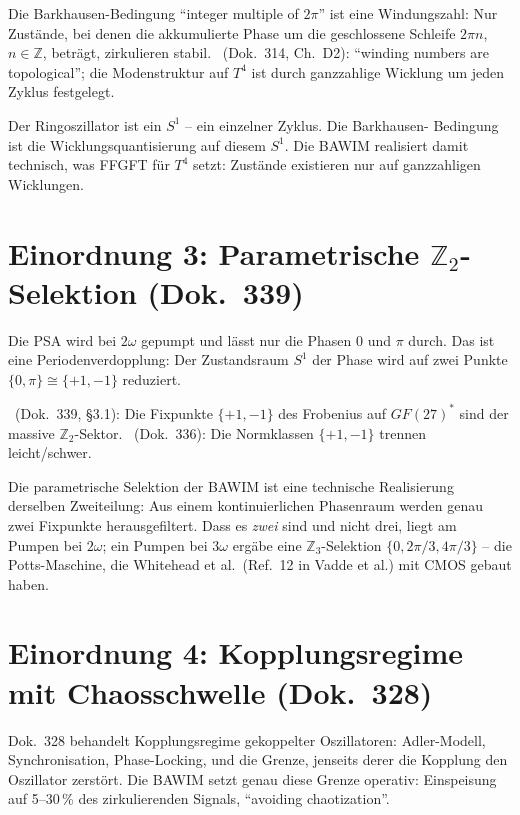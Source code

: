 Die Barkhausen-Bedingung \enquote{integer multiple of $2\pi$} ist eine
Windungszahl: Nur Zustände, bei denen die akkumulierte Phase um die
geschlossene Schleife $2\pi n$, $n\in\mathbb{Z}$, beträgt, zirkulieren
stabil. \BM\ (Dok.~314, Ch.~D2): \enquote{winding numbers are topological};
die Modenstruktur auf $T^4$ ist durch ganzzahlige Wicklung um jeden Zyklus
festgelegt.

Der Ringoszillator ist ein $S^1$ -- ein einzelner Zyklus. Die Barkhausen-%
Bedingung ist die Wicklungsquantisierung auf diesem $S^1$. Die BAWIM
realisiert damit technisch, was FFGFT für $T^4$ setzt: Zustände existieren
nur auf ganzzahligen Wicklungen. \SM

\section{Einordnung 3: Parametrische $\mathbb{Z}_2$-Selektion (Dok.~339)}

Die PSA wird bei $2\omega$ gepumpt und lässt nur die Phasen $0$ und $\pi$
durch. Das ist eine Periodenverdopplung: Der Zustandsraum $S^1$ der Phase
wird auf zwei Punkte $\{0,\pi\}\cong\{+1,-1\}$ reduziert.

\BM\ (Dok.~339, §3.1): Die Fixpunkte $\{+1,-1\}$ des Frobenius auf
$GF(27)^*$ sind der massive $\mathbb{Z}_2$-Sektor. \BM\ (Dok.~336): Die
Normklassen $\{+1,-1\}$ trennen leicht/schwer.

Die parametrische Selektion der BAWIM ist eine technische Realisierung
derselben Zweiteilung: Aus einem kontinuierlichen Phasenraum werden
genau zwei Fixpunkte herausgefiltert. Dass es \emph{zwei} sind und nicht
drei, liegt am Pumpen bei $2\omega$; ein Pumpen bei $3\omega$ ergäbe eine
$\mathbb{Z}_3$-Selektion $\{0,2\pi/3,4\pi/3\}$ -- die Potts-Maschine, die
Whitehead et al.\ (Ref.~12 in Vadde et al.) mit CMOS gebaut haben. \SM

\section{Einordnung 4: Kopplungsregime mit Chaosschwelle (Dok.~328)}

Dok.~328 behandelt Kopplungsregime gekoppelter Oszillatoren: Adler-Modell,
Synchronisation, Phase-Locking, und die Grenze, jenseits derer die Kopplung
den Oszillator zerstört. Die BAWIM setzt genau diese Grenze operativ:
Einspeisung auf 5--30\,\% des zirkulierenden Signals, \enquote{avoiding
chaotization}.

